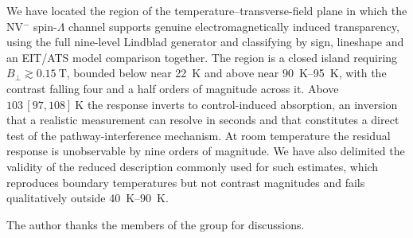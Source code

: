 \documentclass[
  reprint,
  amsmath,amssymb,
  aps,pra,
  superscriptaddress,
  floatfix,
]{revtex4-2}
\newcommand{\Bperp}{B_{\perp}}
\begin{document}
We have located the region of the temperature--transverse-field plane in
which the NV$^{-}$ spin-$\Lambda$ channel supports genuine electromagnetically
induced transparency, using the full nine-level Lindblad generator and
classifying by sign, lineshape and an EIT/ATS model comparison together. The
region is a closed island requiring $\Bperp\gtrsim\SI{0.15}{\tesla}$, bounded
below near \SI{22}{\kelvin} and above near \SI{90}{\kelvin}--\SI{95}{\kelvin},
with the contrast falling four and a half orders of magnitude across it. Above
$103\,[97,108]~\si{\kelvin}$ the response inverts to control-induced
absorption, an inversion that a realistic measurement can resolve in seconds
and that constitutes a direct test of the pathway-interference mechanism. At
room temperature the residual response is unobservable by nine orders of
magnitude. We have also delimited the validity of the reduced description
commonly used for such estimates, which reproduces boundary temperatures but
not contrast magnitudes and fails qualitatively outside
\SI{40}{\kelvin}--\SI{90}{\kelvin}.

\begin{acknowledgments}
The author thanks the members of the group for discussions.
\end{acknowledgments}



\end{document}
